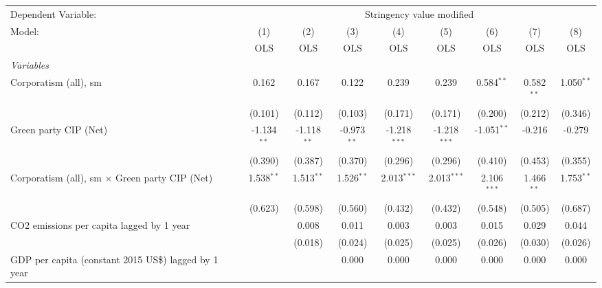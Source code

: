 
\begingroup
\centering
\begin{tabular}{lcccccccc}
   \toprule
   Dependent Variable: & \multicolumn{8}{c}{Stringency value modified}\\
   Model:                                                    & (1)           & (2)           & (3)           & (4)            & (5)            & (6)           & (7)          & (8)\\  
                                                             &  OLS          & OLS           & OLS           & OLS            & OLS            & OLS           & OLS          & OLS\\  
   \midrule
   \emph{Variables}\\
   Corporatism (all), sm                                     & 0.162         & 0.167         & 0.122         & 0.239          & 0.239          & 0.584$^{**}$  & 0.582$^{**}$ & 1.050$^{**}$\\   
                                                             & (0.101)       & (0.112)       & (0.103)       & (0.171)        & (0.171)        & (0.200)       & (0.212)      & (0.346)\\   
   Green party CIP (Net)                                     & -1.134$^{**}$ & -1.118$^{**}$ & -0.973$^{**}$ & -1.218$^{***}$ & -1.218$^{***}$ & -1.051$^{**}$ & -0.216       & -0.279\\   
                                                             & (0.390)       & (0.387)       & (0.370)       & (0.296)        & (0.296)        & (0.410)       & (0.453)      & (0.355)\\   
   Corporatism (all), sm $\times$ Green party CIP (Net)      & 1.538$^{**}$  & 1.513$^{**}$  & 1.526$^{**}$  & 2.013$^{***}$  & 2.013$^{***}$  & 2.106$^{***}$ & 1.466$^{**}$ & 1.753$^{**}$\\   
                                                             & (0.623)       & (0.598)       & (0.560)       & (0.432)        & (0.432)        & (0.548)       & (0.505)      & (0.687)\\   
   CO2 emissions per capita lagged by 1 year                 &               & 0.008         & 0.011         & 0.003          & 0.003          & 0.015         & 0.029        & 0.044\\   
                                                             &               & (0.018)       & (0.024)       & (0.025)        & (0.025)        & (0.026)       & (0.030)      & (0.026)\\   
   GDP per capita (constant 2015 US\$) lagged by 1 year      &               &               & 0.000         & 0.000          & 0.000          & 0.000         & 0.000        & 0.000\\   

\end{tabular}
